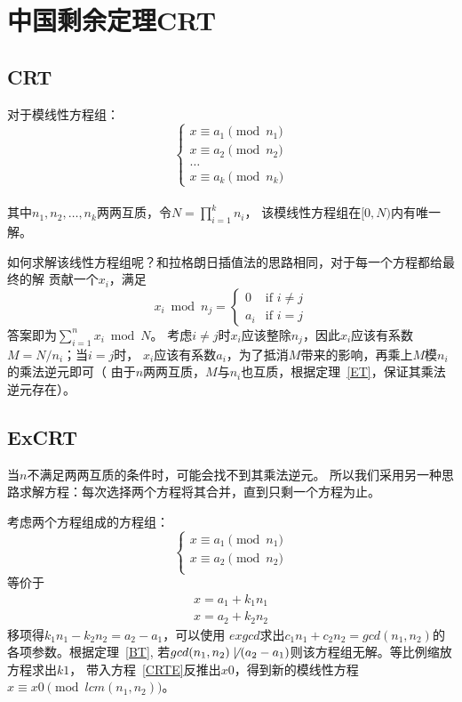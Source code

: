 \section{中国剩余定理CRT}
\subsection{CRT}
\begin{theorem}
	对于模线性方程组：
	\begin{displaymath}
		\left\{\begin{array}{l}
			x \equiv a_1 \pmod{n_1} \\
			x \equiv a_2 \pmod{n_2} \\
			\ldots                  \\
			x \equiv a_k \pmod{n_k}
		\end{array}\right.
	\end{displaymath}\\
	其中$n_1,n_2,\ldots,n_k$两两互质，令$\displaystyle N=\prod_{i=1}^k{n_i}$，
	该模线性方程组在$[0,N)$内有唯一解。
\end{theorem}
如何求解该线性方程组呢？和拉格朗日插值法的思路相同，对于每一个方程都给最终的解
贡献一个$x_i$，满足
\begin{displaymath}
	x_i \bmod n_j =
	\left\{\begin{array}{ll}
		0   & \textrm{if $i\neq j$} \\
		a_i & \textrm{if $i=j$}
	\end{array}\right.
\end{displaymath}
答案即为$\displaystyle \sum_{i=1}^n{x_i} \bmod N$。
考虑$i\neq j$时$x_i$应该整除$n_j$，因此$x_i$应该有系数$M=N/n_i$；当$i=j$时，
$x_i$应该有系数$a_i$，为了抵消$M$带来的影响，再乘上$M$模$n_i$的乘法逆元即可（
由于$n$两两互质，$M$与$n_i$也互质，根据定理~\ref{ET}，保证其乘法逆元存在）。
\subsection{ExCRT}
当$n$不满足两两互质的条件时，可能会找不到其乘法逆元。
所以我们采用另一种思路求解方程：每次选择两个方程将其合并，直到只剩一个方程为止。

考虑两个方程组成的方程组：
\begin{displaymath}
	\left\{\begin{array}{l}
		x \equiv a_1 \pmod{n_1} \\
		x \equiv a_2 \pmod{n_2} \\
	\end{array}\right.
\end{displaymath}
等价于
\begin{eqnarray}
	x=a_1+k_1n_1\label{CRTE}\\
	x=a_2+k_2n_2
\end{eqnarray}
移项得$k_1n_1-k_2n_2=a_2-a_1$，可以使用
$exgcd$求出$c_1n_1+c_2n_2=gcd(n_1,n_2)$的各项参数。根据定理~\ref{BT},
若$gcd(n_1,n_2)\not\mid(a_2-a_1)$则该方程组无解。等比例缩放方程求出$k1$，
带入方程~\ref{CRTE}反推出$x0$，得到新的模线性方程$x \equiv x0
	\pmod{lcm(n_1,n_2)}$。
